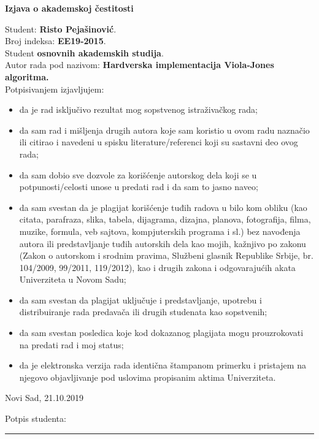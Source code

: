 \begin{center}
  \Large\textbf{Izjava o akademskoj čestitosti}\\
\end{center}

\noindent
Student: \textbf{Risto Pejašinović}. \\
Broj indeksa: \textbf{EE19-2015}. \\
Student \textbf{osnovnih akademskih studija}. \\
Autor rada pod nazivom: \textbf{Hardverska implementacija Viola-Jones algoritma.} \\

Potpisivanjem izjavljujem:
\begin{itemize}
\item da je rad isključivo rezultat mog sopstvenog istraživačkog rada;
\item da sam rad i mišljenja drugih autora koje sam koristio u ovom radu naznačio ili citirao i navedeni u spisku literature/referenci koji su sastavni deo ovog rada;
\item da sam dobio sve dozvole za korišćenje autorskog dela koji se u
  potpunosti/celosti unose u predati rad i da sam to jasno naveo;
\item da sam svestan da je plagijat korišćenje tuđih radova u bilo kom obliku
  (kao citata, parafraza, slika, tabela, dijagrama, dizajna, planova,
  fotografija, filma, muzike, formula, veb sajtova, kompjuterskih programa i
  sl.) bez navođenja autora ili predstavljanje tuđih autorskih dela kao mojih,
  kažnjivo po zakonu (Zakon o autorskom i srodnim pravima, Službeni glasnik
  Republike Srbije, br. 104/2009, 99/2011, 119/2012), kao i drugih zakona i
  odgovarajućih akata Univerziteta u Novom Sadu;
\item da sam svestan da plagijat uključuje i predstavljanje, upotrebu i
  distribuiranje rada predavača ili drugih studenata kao sopstvenih;
\item da sam svestan posledica koje kod dokazanog plagijata mogu
  prouzrokovati na predati rad i moj status;
\item da je elektronska verzija rada identična štampanom primerku i pristajem na
  njegovo objavljivanje pod uslovima propisanim aktima Univerziteta.
\end{itemize}

\vfill

\begin{minipage}{0.4\textwidth}
  Novi Sad, 21.10.2019\\
  \vspace{2.5\baselineskip}
\end{minipage}
\hfill
\begin{minipage}{0.4\textwidth}
  \begin{centering}
    Potpis studenta: \\
    \end{centering}
  \vspace{2.5\baselineskip}
  \hrule width1.0\textwidth\relax
\end{minipage}
